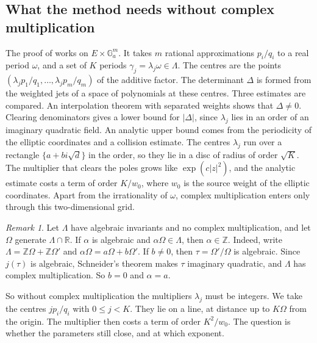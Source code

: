 \documentclass[11pt]{amsart}
\theoremstyle{definition}
\theoremstyle{remark}
\newtheorem{remark}[theorem]{Remark}
\numberwithin{equation}{section}
\newcommand{\Z}{\mathbb Z}
\newcommand{\R}{\mathbb R}
\newcommand{\CM}{\cite{ChudnovskyChudnovsky26}}
\begin{document}
\subsection{What the method needs without complex multiplication}\label{ssec:need}
The proof of \CM{} works on $E\times\mathbb G_a^m$. It takes $m$ rational approximations $p_i/q_i$ to a real
period $\omega$, and a set of $K$ periods $\gamma_j=\lambda_j\omega\in\Lambda$. The centres are the points
$(\lambda_jp_1/q_1,\dots,\lambda_jp_m/q_m)$ of the additive factor. The determinant $\Delta$ is formed from the
weighted jets of a space of polynomials at these centres. Three estimates are compared. An interpolation
theorem with separated weights shows that $\Delta\ne0$. Clearing denominators
gives a lower bound for $|\Delta|$, since $\lambda_j$ lies in an order of an imaginary quadratic field. An
analytic upper bound comes from the periodicity of the elliptic coordinates and a collision estimate. The
centres $\lambda_j$ run over a rectangle $\{a+bi\sqrt d\}$ in the order, so they lie in a disc of radius of order
$\sqrt K$. The multiplier that clears the poles grows like $\exp(c|z|^2)$, and the analytic estimate costs a
term of order $K/w_0$, where $w_0$ is the source weight of the elliptic coordinates. Apart from the
irrationality of $\omega$, complex multiplication enters \CM{} only through this two-dimensional grid.

\begin{remark}\label{rem:noCM}
Let $\Lambda$ have algebraic invariants and no complex multiplication, and let $\Omega$ generate
$\Lambda\cap\R$. If $\alpha$ is algebraic and $\alpha\Omega\in\Lambda$, then $\alpha\in\Z$. Indeed, write
$\Lambda=\Z\Omega+\Z\Omega'$ and $\alpha\Omega=a\Omega+b\Omega'$. If $b\ne0$, then $\tau=\Omega'/\Omega$ is
algebraic. Since $j(\tau)$ is algebraic, Schneider's theorem makes $\tau$ imaginary quadratic, and $\Lambda$ has
complex multiplication. So $b=0$ and $\alpha=a$.
\end{remark}

So without complex multiplication the multipliers $\lambda_j$ must be integers. We take the centres
$jp_i/q_i$ with $0\le j<K$. They lie on a line, at distance up to $K\Omega$ from the origin. The multiplier then costs a term of order $K^2/w_0$. The
question is whether the parameters still close, and at which exponent.
\end{document}
